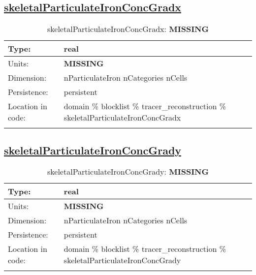 \subsection[skeletalParticulateIronConcGradx]{\hyperref[sec:var_tab_tracer_reconstruction]{skeletalParticulateIronConcGradx}}
\label{subsec:var_sec_tracer_reconstruction_skeletalParticulateIronConcGradx}
\begin{center}
\begin{longtable}{| p{2.0in} | p{4.0in} |}
        \hline 
        Type: & real \\
        \hline 
        Units: & {\bf \color{red} MISSING} \\
        \hline 
        Dimension: & nParticulateIron nCategories nCells \\
        \hline 
        Persistence: & persistent \\
        \hline 
         Location in code: & domain \% blocklist \% tracer\_reconstruction \% skeletalParticulateIronConcGradx \\
         \hline 
    \caption{skeletalParticulateIronConcGradx: {\bf \color{red} MISSING}}
\end{longtable}
\end{center}
\subsection[skeletalParticulateIronConcGrady]{\hyperref[sec:var_tab_tracer_reconstruction]{skeletalParticulateIronConcGrady}}
\label{subsec:var_sec_tracer_reconstruction_skeletalParticulateIronConcGrady}
\begin{center}
\begin{longtable}{| p{2.0in} | p{4.0in} |}
        \hline 
        Type: & real \\
        \hline 
        Units: & {\bf \color{red} MISSING} \\
        \hline 
        Dimension: & nParticulateIron nCategories nCells \\
        \hline 
        Persistence: & persistent \\
        \hline 
         Location in code: & domain \% blocklist \% tracer\_reconstruction \% skeletalParticulateIronConcGrady \\
         \hline 
    \caption{skeletalParticulateIronConcGrady: {\bf \color{red} MISSING}}
\end{longtable}
\end{center}
